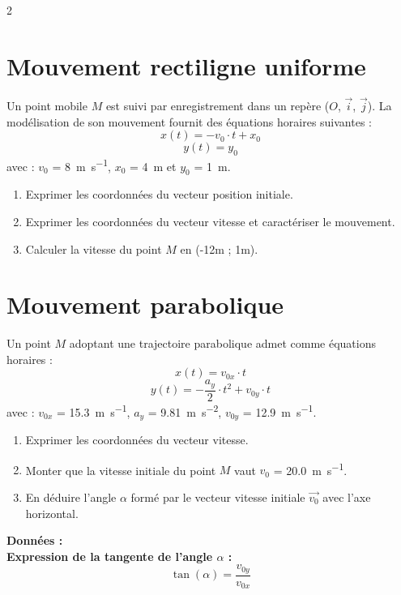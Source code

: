 \documentclass[a4paper,11pt,fleqn]{article}%
\begin{document}
\begin{multicols}{2}
\section{Mouvement rectiligne uniforme}
Un point mobile $M$ est suivi par enregistrement dans un repère ($O$, $\vec{i}$, $\vec{j}$). La modélisation de son mouvement fournit des équations horaires suivantes : $$x(t) = -v_0 \cdot t + x_0$$ $$y(t) = y_0$$ avec : $v_0$ = \SI{8}{\meter\per\second}, $x_0$ = \SI{4}{m} et $y_0$ = \SI{1}{m}.
\begin{enumerate}
	\item Exprimer les coordonnées du vecteur position initiale.
	\item Exprimer les coordonnées du vecteur vitesse et caractériser le mouvement.
	\item Calculer la vitesse du point $M$ en (-12m ; 1m).
\end{enumerate}

\section{Mouvement parabolique}
Un point $M$ adoptant une trajectoire parabolique admet comme équations horaires :
$$x(t)=v_{0x} \cdot t$$
$$y(t) = -\dfrac{a_y}{2} \cdot t^2 + v_{0y} \cdot t$$
avec : $v_{0x}$ = \SI{15,3}{\meter\per\second}, $a_y$ = \SI{9,81}{\meter\per\second\squared}, $v_{0y}$ = \SI{12,9}{\meter\per\second}.
\begin{enumerate}
	\item Exprimer les coordonnées du vecteur vitesse.
	\item Monter que la vitesse initiale du point $M$ vaut $v_0$ = \SI{20,0}{\meter\per\second}.
	\item En déduire l'angle $\alpha$ formé par le vecteur vitesse initiale $\vec{v_0}$ avec l'axe horizontal.
\end{enumerate}
\noindent \colorbox{red!10}{\begin{minipage}{.48\textwidth}
\textbf{Données : }\\
\textbf{Expression de la tangente de l'angle $\alpha$ :} $$\tan{(\alpha)} = \dfrac{v_{0y}}{v_{0x}}$$
\end{minipage}}

\begin{center}
\end{center}
\end{multicols}
\end{document}
